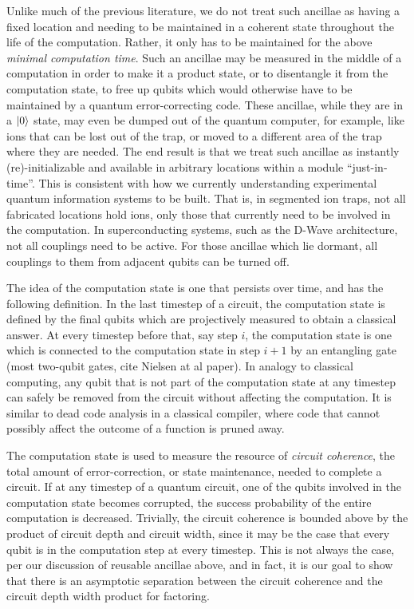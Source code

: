 \documentclass{article}
\begin{document}
Unlike
much of the previous literature, we do not treat such ancillae as having a
fixed location and needing to be maintained in a coherent state throughout
the life of the computation. Rather, it only has to be maintained for the
above \emph{minimal computation time}. Such an ancillae may be measured
in the middle of a computation in order to make it a product state, or
to disentangle it from the computation state, to free up qubits which would
otherwise have to be maintained by a quantum error-correcting code. These
ancillae, while they are in a $\left\vert{0}\right\rangle$ state, may even be dumped out of the
quantum computer, for example, like ions that can be lost out of the trap,
or moved to a different area of the trap where they are needed. The end
result is that we treat such ancillae as instantly (re)-initializable and
available in arbitrary locations within a module ``just-in-time''. This is
consistent with how we currently understanding experimental quantum information
systems to be built. That is, in segmented ion traps, not all fabricated locations
hold ions, only those that currently need to be involved in the computation.
In superconducting systems, such as the D-Wave architecture, not all
couplings need to be active. For those ancillae which lie dormant, all
couplings to them from adjacent qubits can be turned off.

The idea of the computation state is one that persists over time, and has
the following definition. In the last timestep of a circuit, the computation
state is defined by
the final qubits which are projectively measured to obtain a classical
answer. At every timestep before that, say step $i$,
the computation state is one which is connected to the computation state in
step $i+1$ by an entangling gate (most two-qubit gates, cite Nielsen at al
paper). In analogy to classical computing, any qubit that is not part of the
computation state at any timestep can safely be removed from the circuit
without affecting the computation. It is similar to dead code analysis in a
classical compiler, where code that cannot possibly affect the outcome of
a function is pruned away.

The computation state is used to measure the resource of \emph{circuit coherence},
the total amount of error-correction, or state maintenance, needed to complete
a circuit. If at any timestep of a quantum circuit, one of the qubits involved
in the computation state becomes corrupted, the success probability of the
entire computation is decreased. Trivially, the circuit coherence is
bounded above by the product of circuit depth and circuit width, since it
may be the case that every qubit is in the computation step at every timestep.
This is not always the case, per our discussion of reusable ancillae above,
and in fact, it is our goal to show that there is an asymptotic separation
between the circuit coherence and the circuit depth width product for
factoring.
\end{document}
